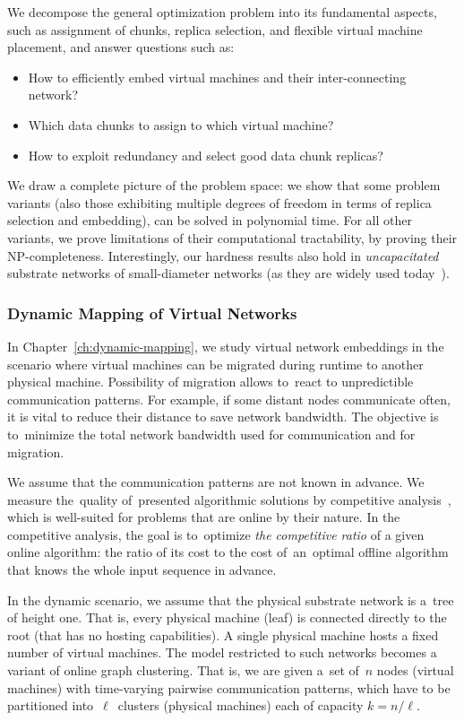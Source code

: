 We decompose the general optimization problem into its fundamental aspects, such as
assignment of chunks, replica selection, and flexible virtual machine
placement, and answer questions such as:
\begin{itemize}
\item How to efficiently embed virtual machines and their inter-connecting network?
\item Which data chunks to assign to which virtual machine?
\item How to exploit redundancy and select good data chunk replicas?
\end{itemize}

We draw a complete picture of the problem space: we show that
some problem variants (also those exhibiting multiple degrees of freedom in terms of
replica selection and embedding),
can be solved in polynomial time. For all other variants, we prove limitations of their
computational tractability, by proving their NP-completeness. Interestingly,
our hardness results also hold in \emph{uncapacitated} substrate
networks of small-diameter networks (as they are
widely used today~\cite{fattree}).


\subsubsection{Dynamic Mapping of Virtual Networks}
\label{sec:contributions-dynamic-mapping}

In Chapter~\ref{ch:dynamic-mapping}, we study virtual network embeddings in the scenario where virtual machines can be migrated during runtime to another physical machine.
Possibility of migration allows to~react to unpredictible communication patterns.
For example, if some distant nodes communicate often, it is vital to reduce their distance to save network bandwidth.
The objective is to~minimize the total network bandwidth used for communication and for migration.

We assume that the communication patterns are not known in advance.
We measure the~quality of~presented algorithmic solutions by competitive analysis~\cite{borodin-book}, which is well-suited for problems that are online by their nature.
In the competitive analysis, the goal is to~optimize \emph{the competitive ratio} of a given online algorithm: the ratio of its cost to the cost of~an~optimal offline algorithm that knows the whole input sequence in advance.

In the dynamic scenario, we assume that the physical substrate network is a~tree of height one.
That is, every physical machine (leaf) is connected directly to the root (that has no hosting capabilities).
A single physical machine hosts a fixed number of virtual machines.
The model restricted to such networks becomes a variant of online graph clustering.
That is, we are given a~set of~$n$ nodes (virtual machines) with time-varying pairwise
communication patterns, which have to be partitioned into~$\ell$~clusters (physical machines) each of
capacity $k=n/\ell$.

